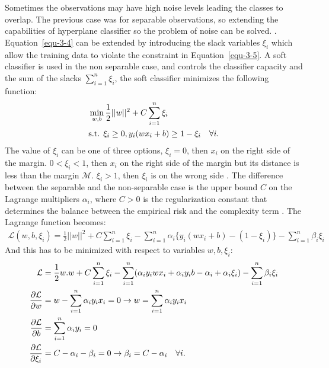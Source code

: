 \begin{itemize}
Sometimes the observations may have high noise levels leading the classes to overlap. The previous case was for separable observations, so extending the capabilities of hyperplane classifier so the problem of noise can be solved. \citep{Maimon}.
Equation~\ref{equ-3-4} can be extended by introducing the slack variables $\xi_i$ which allow the training data to violate the constraint in Equation~\ref{equ-3-5}.
A soft classifier is used in the non separable case, and controls the classifier capacity and the sum of the slacks $\sum_{i=1}^{n} \xi_i$, the soft classifier minimizes the following function:
\vspace{-4mm}
\begin{align}
\label{equ-3-13}
&\min_{w,b}\frac{1}{2}||w||^2 + C \sum_{i=1}^{n}{\xi_i} \\
&\text{s.t. } \xi_i \geq 0, y_i(w x_i +b) \geq 1-\xi_i \quad \forall i. \notag
\end{align}
The value of $\xi_i$ can be one of three options, $\xi_i = 0$, then $x_i$ on the right side of the margin. $0< \xi_i <1$, then $x_i$ on the right side of the margin but its distance is less than the margin $\mathcal{M}$. $\xi_i > 1$, then $\xi_i$ is on the wrong side \citep{Thuso}.
The difference between the separable and the non-separable case is the upper bound $C$ on the Lagrange multipliers $\alpha_i$, where $C > 0$ is the regularization constant that determines the balance between the empirical risk and the complexity term \citep{Maimon}. The Lagrange function becomes:
\begin{align}
\label{equ-3-14}
\mathcal{L}(w,b,\xi_i) = \frac{1}{2} ||w||^2
 + C \sum_{i=1}^{n}{\xi_i} - \sum_{i=1}^{n}{\alpha_i \lbrace y_i (w x_i + b) - (1-\xi_i) \rbrace} - \sum_{i=1}^{n}{\beta_i \xi_i}
 \end{align}
And this has to be minimized with respect to variables $w,b,\xi_i$:
\begin{align}
\notag
\mathcal{L} &= \frac{1}{2} w.w + C \sum_{i=1}^{n}{\xi_i} - \sum_{i=1}^{n}(\alpha_i y_i w x_i + \alpha_i y_i b - \alpha_i + \alpha_i \xi_i) - \sum_{i=1}^{n} \beta_i \xi_i \\
\label{equ-3-15}
\frac{\partial \mathcal{L}}{\partial w} &= w - \sum_{i=1}^{n} \alpha_i y_i x_i = 0 \rightarrow w = \sum_{i=1}^{n} \alpha_i y_i x_i \\
\label{equ-3-16}
\frac{\partial \mathcal{L}}{\partial b} &= \sum_{i=1}^{n} \alpha_i y_i = 0\\
\label{equ-3-17}
\frac{\partial \mathcal{L}}{\partial \xi_i} &= C - \alpha_i - \beta_i = 0 \rightarrow \beta_i = C - \alpha_i \quad \forall i.

\end{align}
\end{itemize}
